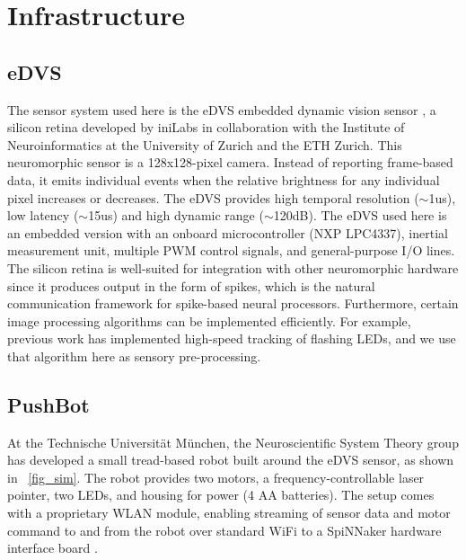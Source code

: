 \documentclass{frontiersSCNS}
\begin{document}
\section{Infrastructure}
\label{infrastructure}

\subsection{eDVS}
The sensor system used here is the eDVS embedded dynamic vision 
sensor \citep{conradt2009embedded}, a silicon retina developed by iniLabs in 
collaboration with the Institute of Neuroinformatics at the University of 
Zurich and the ETH Zurich. This neuromorphic sensor is a 128x128-pixel camera. 
Instead of reporting frame-based data, it emits individual events when the 
relative brightness for any individual pixel increases or decreases. The eDVS 
provides high temporal resolution ($\sim$1us), low latency ($\sim$15us) and high dynamic 
range ($\sim$120dB). The eDVS used here is an embedded version with an onboard 
microcontroller (NXP LPC4337), inertial measurement unit, multiple PWM control 
signals, and general-purpose I/O lines. The silicon retina is well-suited for 
integration with other neuromorphic hardware since it produces output in the 
form of spikes, which is the natural communication framework for spike-based 
neural processors. Furthermore, certain image processing algorithms can be 
implemented efficiently. For example, previous work \citep{muller2011miniature} 
has implemented high-speed tracking of flashing LEDs, and we use that algorithm 
here as sensory pre-processing.


\subsection{PushBot}
At the Technische Universit{\"a}t M{\"u}nchen, the Neuroscientific
System Theory group has developed a small tread-based robot built around the 
eDVS sensor, as shown in \figurename~\ref{fig_sim}. The robot provides two motors, a frequency-controllable laser pointer, two LEDs, and housing for power (4 AA batteries). The setup comes with a proprietary WLAN module, enabling streaming of sensor data and motor command to and from the robot over standard WiFi to a SpiNNaker hardware interface board \citep{denk2013}.
\end{document}
